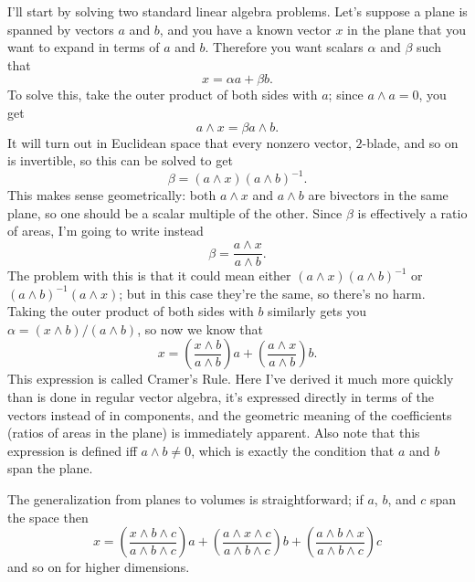 \documentclass{utarticle}
\DeclareMathOperator{\out}{\wedge}
\begin{document}
I'll start by solving two standard linear algebra problems.  Let's suppose a plane is 
spanned by vectors $a$ and $b$, and you have a known vector $x$ in the plane that 
you want to expand in terms of $a$ and $b$.  Therefore you want scalars $\alpha$ and 
$\beta$ such that
\begin{equation} x = \alpha a + \beta b. \end{equation}
To solve this, take the outer product of both sides with $a$; since $a \out a = 0$,
you get
\begin{equation} a \out x = \beta a \out b. \end{equation}
It will turn out in Euclidean space that every nonzero vector, $2$-blade, and so on is
invertible, so this can be solved to get
\begin{equation} \beta = (a \out x) (a \out b)^{-1}. \end{equation}
This makes sense geometrically: both $a \out x$ and $a \out b$ are
bivectors in the same plane, so one should be a scalar multiple of the other.  Since 
$\beta$ is effectively a ratio of areas, I'm going to write instead
\begin{equation} \beta = \frac{a \out x}{a \out b}. \end{equation}
The problem with this is that it could mean either $(a \out x) (a \out b)^{-1}$ 
or $(a \out b)^{-1}(a \out x)$; but in this case they're the same, so there's no 
harm.  Taking the outer product of both sides with $b$ similarly gets you $\alpha 
= (x \out b)/(a \out b)$, so now we know that
\begin{equation} 
x =  \left( \frac{x \out b}{a \out b} \right) a + \left( \frac{a \out x}{a \out b} \right) b.
\label{xon2dbasis}
\end{equation}
This expression is called Cramer's Rule.  Here I've derived it much more quickly than 
is done in regular vector algebra, it's expressed directly in terms of the vectors instead 
of in components, and the geometric meaning of the coefficients (ratios of areas in the 
plane) is immediately apparent.  Also note that this expression is defined iff $a \out b 
\neq 0$, which is exactly the condition that $a$ and $b$ span the plane.

The generalization from planes to volumes is straightforward; if $a$, $b$, and $c$ span 
the space then
\begin{equation} 
x =  \left( \frac{x \out b \out c}{a \out b \out c} \right) a + 
       \left( \frac{a \out x \out c}{a \out b \out c} \right) b + 
       \left( \frac{a \out b \out x}{a \out b \out c} \right) c
\label{xon3dbasis}
\end{equation}
and so on for higher dimensions.
\end{document}
